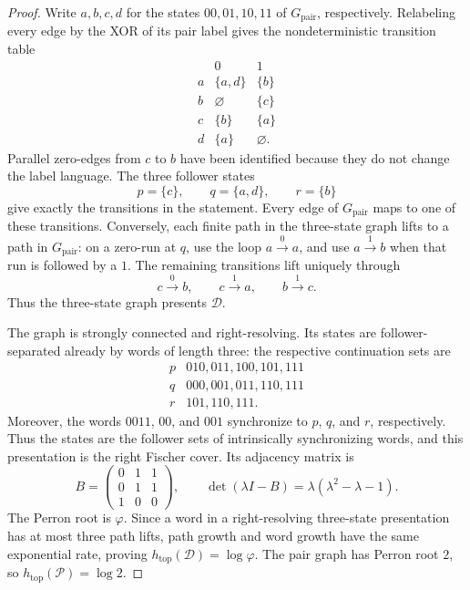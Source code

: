 \begin{proof}
Write \(a,b,c,d\) for the states \(00,01,10,11\) of
\(G_{\mathrm{pair}}\), respectively.  Relabeling every edge by the XOR of
its pair label gives the nondeterministic transition table
\[
\begin{array}{c|cc}
 &0&1\\ \hline
a&\{a,d\}&\{b\}\\
b&\varnothing&\{c\}\\
c&\{b\}&\{a\}\\
d&\{a\}&\varnothing.
\end{array}
\]
Parallel zero-edges from \(c\) to \(b\) have been identified because they
do not change the label language.  The three follower states
\[
p=\{c\},\qquad q=\{a,d\},\qquad r=\{b\}
\]
give exactly the transitions in the statement.  Every edge of
\(G_{\mathrm{pair}}\) maps to one of these transitions.  Conversely, each
finite path in the three-state graph lifts to a path in
\(G_{\mathrm{pair}}\): on a zero-run at \(q\), use the loop
\(a\xrightarrow{0}a\), and use \(a\xrightarrow{1}b\) when that run is
followed by a \(1\).  The remaining transitions lift uniquely through
\[
c\xrightarrow{0}b,\qquad c\xrightarrow{1}a,\qquad
b\xrightarrow{1}c.
\]
Thus the three-state graph presents \(\mathcal D\).

The graph is strongly connected and right-resolving.  Its states are
follower-separated already by words of length three: the respective
continuation sets are
\[
\begin{array}{c|l}
p&010,011,100,101,111\\
q&000,001,011,110,111\\
r&101,110,111.
\end{array}
\]
Moreover, the words \(0011\), \(00\), and \(001\) synchronize to \(p\),
\(q\), and \(r\), respectively. Thus the states are the follower sets of
intrinsically synchronizing words, and this presentation is the right
Fischer cover. Its adjacency matrix is
\[
B=
\begin{pmatrix}
0&1&1\\
0&1&1\\
1&0&0
\end{pmatrix},
\qquad
\det(\lambda I-B)=\lambda(\lambda^2-\lambda-1).
\]
The Perron root is \(\varphi\).  Since a word in a right-resolving
three-state presentation has at most three path lifts, path growth and word
growth have the same exponential rate, proving
\(h_{\mathrm{top}}(\mathcal D)=\log\varphi\).  The pair graph has Perron
root \(2\), so \(h_{\mathrm{top}}(\mathcal P)=\log2\).


\end{proof}
